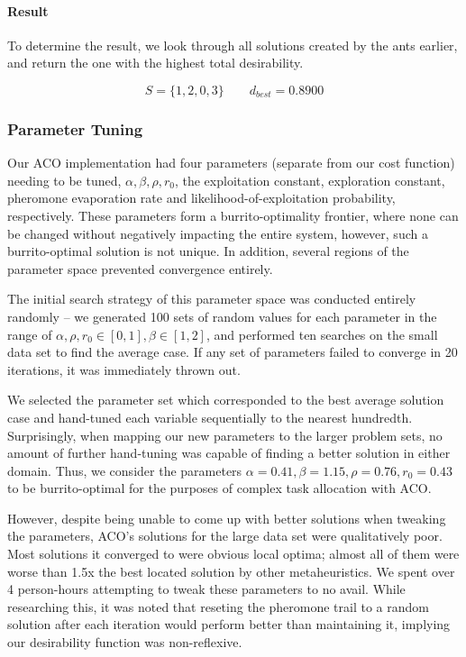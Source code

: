 \documentclass[a4paper]{article}
\newcommand{\subsubsubsection}[1]{\paragraph{#1} \mbox{}}
\begin{document}
\subsubsubsection{Result}

To determine the result, we look through all solutions created by the ants earlier, and return the one with the highest total desirability.

$$
S = \{1, 2, 0, 3\} \qquad d_{best} = 0.8900
$$


\subsubsection{Parameter Tuning}

Our ACO implementation had four parameters (separate from our cost function) needing to be tuned, $\alpha, \beta, \rho, r_0$, the exploitation constant, exploration constant, pheromone evaporation rate and likelihood-of-exploitation probability, respectively. These parameters form a  burrito-optimality frontier, where none can be changed without negatively impacting the entire system, however, such a burrito-optimal solution is not unique. In addition, several regions of the parameter space prevented convergence entirely.

The initial search strategy of this parameter space was conducted entirely randomly -- we generated 100 sets of random values for each parameter in the range of $\alpha, \rho, r_0 \in [0, 1], \beta \in [1, 2]$, and performed ten searches on the small data set to find the average case. If any set of parameters failed to converge in 20 iterations, it was immediately thrown out.

We selected the parameter set which corresponded to the best average solution case and hand-tuned each variable sequentially to the nearest hundredth. Surprisingly, when mapping our new parameters to the larger problem sets, no amount of further hand-tuning was capable of finding a better solution in either domain. Thus, we consider the parameters $\alpha = 0.41, \beta = 1.15, \rho = 0.76, r_0 = 0.43$ to be burrito-optimal for the purposes of complex task allocation with ACO.

However, despite being unable to come up with better solutions when tweaking the parameters, ACO's solutions for the large data set were qualitatively poor. Most solutions it converged to were obvious local optima; almost all of them were worse than 1.5x the best located solution by other metaheuristics. We spent over 4 person-hours attempting to tweak these parameters to no avail. While researching this, it was noted that reseting the pheromone trail to a random solution after each iteration would perform better than maintaining it, implying our desirability function was non-reflexive.
\end{document}
